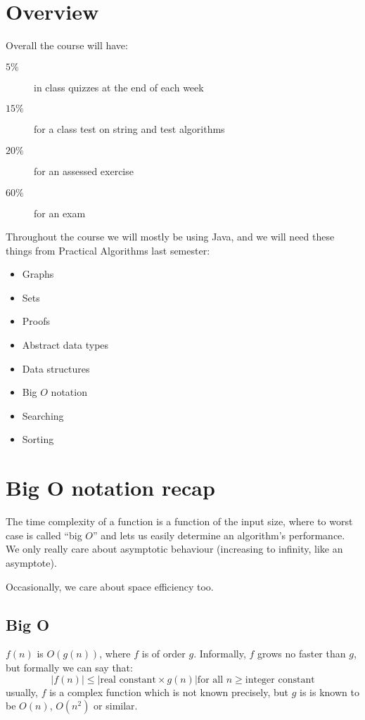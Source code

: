 \section{Overview}\label{sec:a_overview}

Overall the course will have:

\begin{description}
    \item[\(5\%\)] in class quizzes at the end of each week
    \item[\(15\%\)] for a class test on string and test algorithms
    \item[\(20\%\)] for an assessed exercise
    \item[\(60\%\)] for an exam
\end{description}

Throughout the course we will mostly be using Java, and we will need these things from Practical Algorithms last semester:
\begin{itemize}
    \item Graphs
    \item Sets
    \item Proofs
    \item Abstract data types
    \item Data structures
    \item Big \(O\) notation
    \item Searching
    \item Sorting
\end{itemize}

\section{Big O notation recap}\label{sec:big_o_recap}

The time complexity of a function is a function of the input size, where to worst case is called ``big \(O\)'' and lets us easily determine an algorithm's performance.
We only really care about asymptotic behaviour (increasing to infinity, like an asymptote).

Occasionally, we care about space efficiency too.

\subsection{Big O}\label{sub:big_o}

\(f(n)\) is \(O(g(n))\), where \(f\) is of order \(g\).
Informally, \(f\) grows no faster than \(g\), but formally we can say that:
\[
    | f(n) | \leq | \text{real constant} \times g(n) | \text{for all \(n \geq \text{integer constant}\)}
\]
usually, \(f\) is a complex function which is not known precisely, but \(g\) is is known to be \(O(n)\), \(O(n^2)\) or similar.


